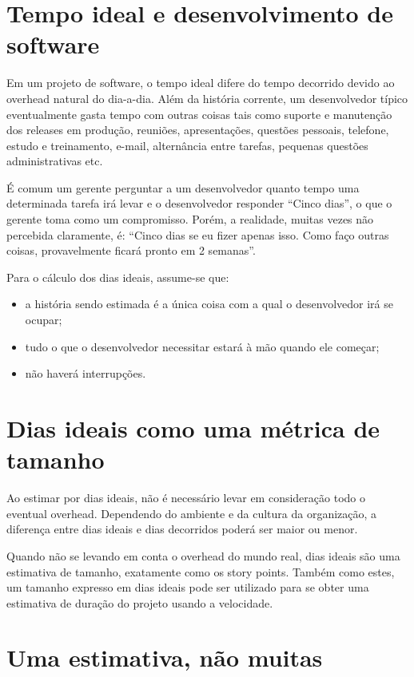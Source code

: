 \documentclass[a4paper,abntfigtabnum,noindentfirst]{abnt}
\begin{document}
\section{Tempo ideal e desenvolvimento de software}

Em um projeto de software, o tempo ideal difere do tempo decorrido devido ao overhead natural do dia-a-dia. Além da história corrente, um desenvolvedor típico eventualmente gasta tempo com outras coisas tais como suporte e manutenção dos releases em produção, reuniões, apresentações, questões pessoais, telefone, estudo e treinamento, e-mail, alternância entre tarefas, pequenas questões administrativas etc.

É comum um gerente perguntar a um desenvolvedor quanto tempo uma determinada tarefa irá levar e o desenvolvedor responder ``Cinco dias'', o que o gerente toma como um compromisso. Porém, a realidade, muitas vezes não percebida claramente, é: ``Cinco dias se eu fizer apenas isso. Como faço outras coisas, provavelmente ficará pronto em 2 semanas''.

Para o cálculo dos dias ideais, assume-se que:
\begin{itemize}
\item a história sendo estimada é a única coisa com a qual o desenvolvedor irá se ocupar;
\item tudo o que o desenvolvedor necessitar estará à mão quando ele começar;
\item não haverá interrupções.
\end{itemize}


\section{Dias ideais como uma métrica de tamanho}

Ao estimar por dias ideais, não é necessário levar em consideração todo o eventual overhead. Dependendo do ambiente e da cultura da organização, a diferença entre dias ideais e dias decorridos poderá ser maior ou menor.

Quando não se levando em conta o overhead do mundo real, dias ideais são uma estimativa de tamanho, exatamente como os story points. Também como estes, um tamanho expresso em dias ideais pode ser utilizado para se obter uma estimativa de duração do projeto usando a velocidade.


\section{Uma estimativa, não muitas}
\end{document}
